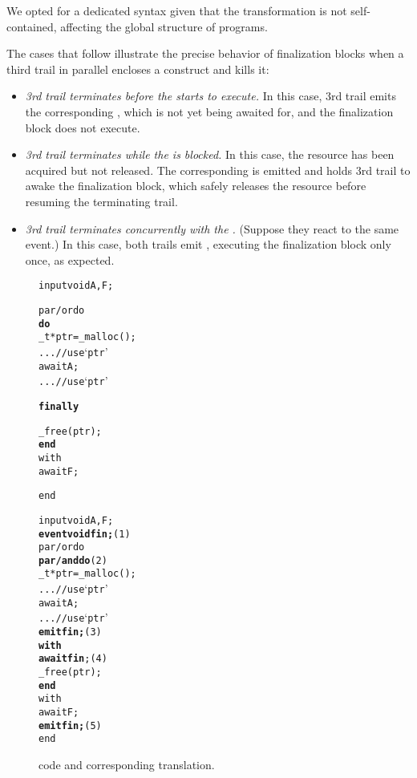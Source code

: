 We opted for a dedicated syntax given that the transformation is not 
self-contained, affecting the global structure of programs.

The cases that follow illustrate the precise behavior of finalization blocks 
when a third trail in parallel encloses a \DOFIN construct and kills it:

\begin{itemize}
\item \emph{3rd trail terminates before the \DOFIN starts to execute.}
In this case, 3rd trail emits the corresponding , which is not yet 
being awaited for, and the finalization block does not execute.
\item \emph{3rd trail terminates while the \DOFIN is blocked.}
In this case, the resource has been acquired but not released.
The corresponding  is emitted and holds 3rd trail to awake the 
finalization block, which safely releases the resource before resuming the 
terminating trail.
\item \emph{3rd trail terminates concurrently with the \DOFIN.} (Suppose they 
react to the same event.)
In this case, both trails emit , executing the finalization block 
only once, as expected.
\end{itemize}

\begin{figure}[t]
{\small
\begin{minipage}[t]{0.45\linewidth}
\begin{alltt}
  input void A,F;

  par/or do
    \textbf{do}
      \_t* ptr = \_malloc();
      ... // use `ptr'
      await A;
      ... // use `ptr'

    \textbf{finally}

      \_free(ptr);
    \textbf{end}
  with
    await F;

  end
\end{alltt}
\end{minipage}
%
\hspace{0.5cm}
%
\begin{minipage}[t]{0.45\linewidth}
\begin{alltt}
input void A,F;
\textbf{event void fin;}      (1)
par/or do
  \textbf{par/and do}          (2)
    \_t* ptr = \_malloc();
    ... // use `ptr'
    await A;
    ... // use `ptr'
    \textbf{emit fin;}        (3)
  \textbf{with}
    \textbf{await fin};       (4)
    \_free(ptr);
  \textbf{end}
with
  await F;
  \textbf{emit fin;}          (5)
end
\end{alltt}
\end{minipage}

\caption{ \DOFIN code and corresponding translation.
\label{lst:finally}
}
}
\end{figure}

